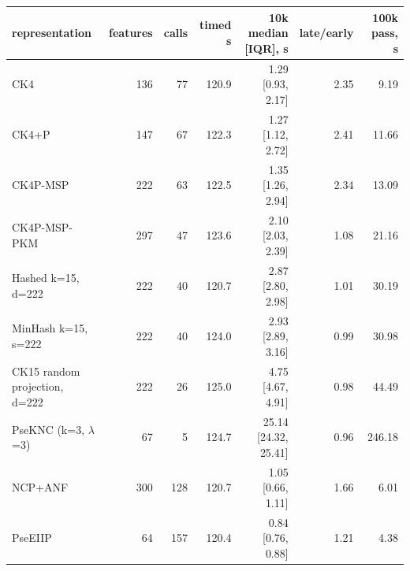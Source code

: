 \begin{tabular}{@{}lrrrrrr@{}}
\toprule
\textbf{representation} & \textbf{features} & \textbf{calls} & \textbf{timed s} & \textbf{10k median [IQR], s} & \textbf{late/early} & \textbf{100k pass, s} \\
\midrule
CK4 & 136 & 77 & 120.9 & 1.29 [0.93, 2.17] & 2.35 & 9.19 \\
CK4+P & 147 & 67 & 122.3 & 1.27 [1.12, 2.72] & 2.41 & 11.66 \\
CK4P-MSP & 222 & 63 & 122.5 & 1.35 [1.26, 2.94] & 2.34 & 13.09 \\
CK4P-MSP-PKM & 297 & 47 & 123.6 & 2.10 [2.03, 2.39] & 1.08 & 21.16 \\
Hashed k=15, d=222 & 222 & 40 & 120.7 & 2.87 [2.80, 2.98] & 1.01 & 30.19 \\
MinHash k=15, s=222 & 222 & 40 & 124.0 & 2.93 [2.89, 3.16] & 0.99 & 30.98 \\
CK15 random projection, d=222 & 222 & 26 & 125.0 & 4.75 [4.67, 4.91] & 0.98 & 44.49 \\
PseKNC (k=3, $\lambda$=3) & 67 & 5 & 124.7 & 25.14 [24.32, 25.41] & 0.96 & 246.18 \\
NCP+ANF & 300 & 128 & 120.7 & 1.05 [0.66, 1.11] & 1.66 & 6.01 \\
PseEIIP & 64 & 157 & 120.4 & 0.84 [0.76, 0.88] & 1.21 & 4.38 \\
\bottomrule
\end{tabular}
